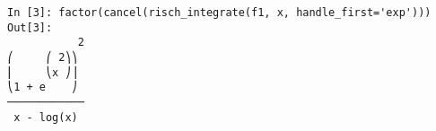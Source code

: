 ﻿\documentclass{article}
\begin{document}
\normalsize
\begin{Verbatim}
In [3]: factor(cancel(risch_integrate(f1, x, handle_first='exp')))
Out[3]: 
           2
⎛     ⎛ 2⎞⎞ 
⎜     ⎝x ⎠⎟ 
⎝1 + e    ⎠ 
────────────
 x - log(x) 
\end{Verbatim}
\end{document}
